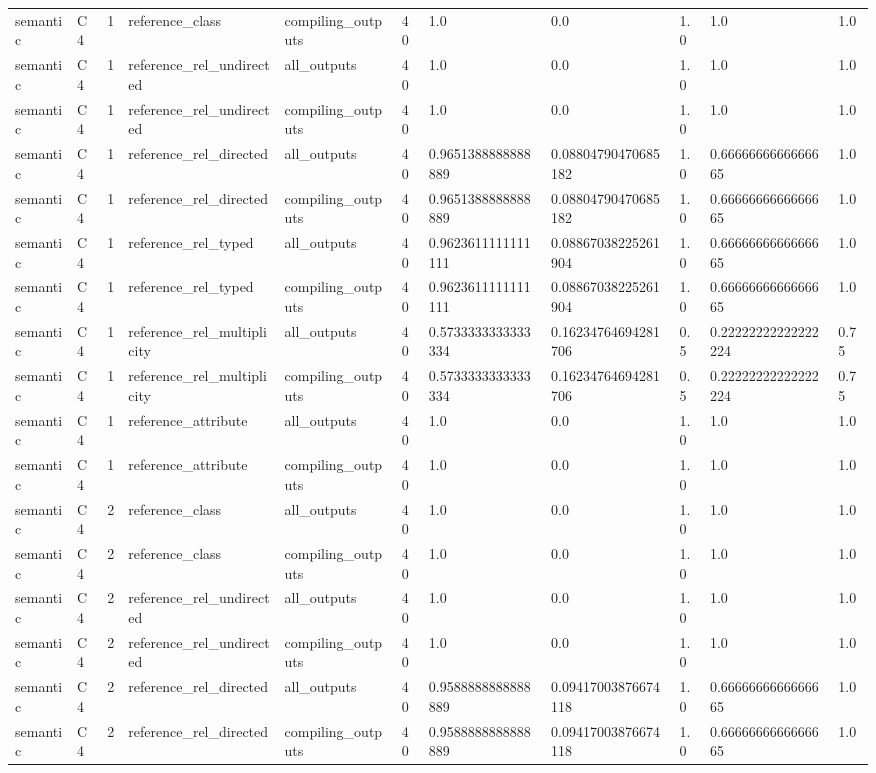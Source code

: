 \begin{tabular}{lllllllllll}
semantic & C4 & 1 & reference\_class & compiling\_outputs & 40 & 1.0 & 0.0 & 1.0 & 1.0 & 1.0 \\
semantic & C4 & 1 & reference\_rel\_undirected & all\_outputs & 40 & 1.0 & 0.0 & 1.0 & 1.0 & 1.0 \\
semantic & C4 & 1 & reference\_rel\_undirected & compiling\_outputs & 40 & 1.0 & 0.0 & 1.0 & 1.0 & 1.0 \\
semantic & C4 & 1 & reference\_rel\_directed & all\_outputs & 40 & 0.9651388888888889 & 0.08804790470685182 & 1.0 & 0.6666666666666665 & 1.0 \\
semantic & C4 & 1 & reference\_rel\_directed & compiling\_outputs & 40 & 0.9651388888888889 & 0.08804790470685182 & 1.0 & 0.6666666666666665 & 1.0 \\
semantic & C4 & 1 & reference\_rel\_typed & all\_outputs & 40 & 0.9623611111111111 & 0.08867038225261904 & 1.0 & 0.6666666666666665 & 1.0 \\
semantic & C4 & 1 & reference\_rel\_typed & compiling\_outputs & 40 & 0.9623611111111111 & 0.08867038225261904 & 1.0 & 0.6666666666666665 & 1.0 \\
semantic & C4 & 1 & reference\_rel\_multiplicity & all\_outputs & 40 & 0.5733333333333334 & 0.16234764694281706 & 0.5 & 0.22222222222222224 & 0.75 \\
semantic & C4 & 1 & reference\_rel\_multiplicity & compiling\_outputs & 40 & 0.5733333333333334 & 0.16234764694281706 & 0.5 & 0.22222222222222224 & 0.75 \\
semantic & C4 & 1 & reference\_attribute & all\_outputs & 40 & 1.0 & 0.0 & 1.0 & 1.0 & 1.0 \\
semantic & C4 & 1 & reference\_attribute & compiling\_outputs & 40 & 1.0 & 0.0 & 1.0 & 1.0 & 1.0 \\
semantic & C4 & 2 & reference\_class & all\_outputs & 40 & 1.0 & 0.0 & 1.0 & 1.0 & 1.0 \\
semantic & C4 & 2 & reference\_class & compiling\_outputs & 40 & 1.0 & 0.0 & 1.0 & 1.0 & 1.0 \\
semantic & C4 & 2 & reference\_rel\_undirected & all\_outputs & 40 & 1.0 & 0.0 & 1.0 & 1.0 & 1.0 \\
semantic & C4 & 2 & reference\_rel\_undirected & compiling\_outputs & 40 & 1.0 & 0.0 & 1.0 & 1.0 & 1.0 \\
semantic & C4 & 2 & reference\_rel\_directed & all\_outputs & 40 & 0.9588888888888889 & 0.09417003876674118 & 1.0 & 0.6666666666666665 & 1.0 \\
semantic & C4 & 2 & reference\_rel\_directed & compiling\_outputs & 40 & 0.9588888888888889 & 0.09417003876674118 & 1.0 & 0.6666666666666665 & 1.0 \\

\end{tabular}
